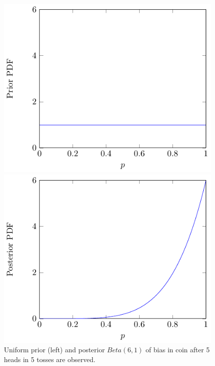 \begin{figure}[h!]
\centering
\begin{minipage}{.5\textwidth}
  \centering
  \includegraphics[width=0.9\linewidth]{tikz/figure1}
\end{minipage}%
\begin{minipage}{.5\textwidth}
  \centering
  \includegraphics[width=0.9\linewidth]{tikz/figure2}
\end{minipage}
\caption{%
Uniform prior (left) and posterior \(Beta(6,1)\) of bias in 
coin after 5 heads in 5 tosses are observed.}
\label{fig:prior}
\end{figure}

